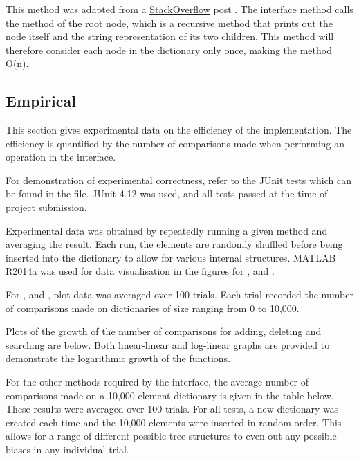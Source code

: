\subsubsection{}
This method was adapted from a \href{http://stackoverflow.com/}{StackOverflow} post \cite{stackoverflow}. The interface method  calls the  method of the root node, which is a recursive method that prints out the node itself and the string representation of its two children. This method will therefore consider each node in the dictionary only once, making the method O(n).

\subsection{Empirical}

This section gives experimental data on the efficiency of the implementation. The efficiency is quantified by the number of comparisons made when performing an operation in the  interface.

For demonstration of experimental correctness, refer to the JUnit tests which can be found in the  file. JUnit 4.12 was used, and all tests passed at the time of project submission.

Experimental data was obtained by repeatedly running a given method and averaging the result. Each run, the elements are randomly shuffled before being inserted into the dictionary to allow for various internal structures. MATLAB R2014a was used for data visualisation in the figures for ,  and .

For ,  and , plot data was averaged over 100 trials. Each trial recorded the number of comparisons made on dictionaries of size ranging from 0 to 10,000.

Plots of the growth of the number of comparisons for adding, deleting and searching are below. Both linear-linear and log-linear graphs are provided to demonstrate the logarithmic growth of the functions.

For the other methods required by the  interface, the average number of comparisons made on a 10,000-element dictionary is given in the table below. These results were averaged over 100 trials. For all tests, a new dictionary was created each time and the 10,000 elements were inserted in random order. This allows for a range of different possible tree structures to even out any possible biases in any individual trial.

